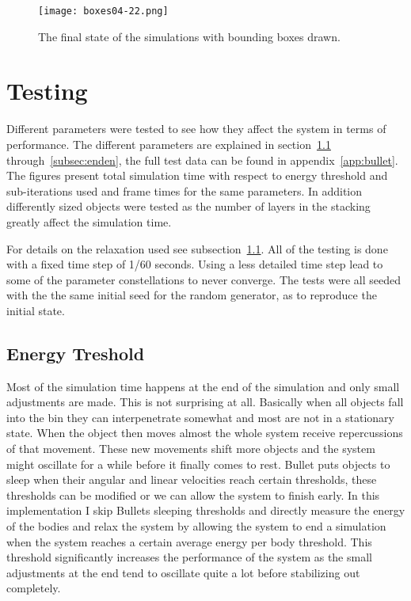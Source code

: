 \begin{figure}[H]
  \centering
  \texttt{[image: boxes04-22.png]}
  \caption{The final state of the simulations with bounding boxes drawn.}
  \label{fig:stopStackBoxes}
\end{figure}

\section{Testing}\label{sec:testing}
Different parameters were tested to see how they affect the system in terms of performance.
The different parameters are explained in section~\ref{subsec:relax} through~\ref{subsec:enden},
 the full test data can be found in appendix~\ref{app:bullet}.
The figures present total simulation time with respect to energy threshold and sub-iterations used and
frame times for the same parameters. In addition differently sized objects were tested
as the number of layers in the stacking greatly affect the simulation time.

For details on the relaxation used see subsection~\ref{subsec:relax}.
All of the testing is done with a fixed time step of 1/60 seconds. Using a less detailed
time step lead to some of the parameter constellations to never converge.
The tests were all seeded with the the same initial seed for the random generator,
as to reproduce the initial state.

\subsection{Energy Treshold}\label{subsec:relax}
Most of the simulation time happens at the end of the simulation and only small
adjustments are made. This is not surprising at all. Basically when all objects
fall into the bin they can interpenetrate somewhat and most are not in
a stationary state. When the object then moves almost the whole system receive
repercussions of that movement. These new movements shift more objects and the
system might oscillate for a while before it finally comes to rest.
Bullet puts objects to sleep when their angular and linear velocities reach certain
thresholds, these thresholds can be modified or we can
allow the system to finish early. In this implementation I skip Bullets sleeping
thresholds and directly measure the energy of the bodies and relax the system by
allowing the system to end a simulation when the system reaches a certain
average energy per body threshold. This threshold significantly increases the performance
of the system as the small adjustments at the end tend to oscillate quite a lot before
stabilizing out completely.

